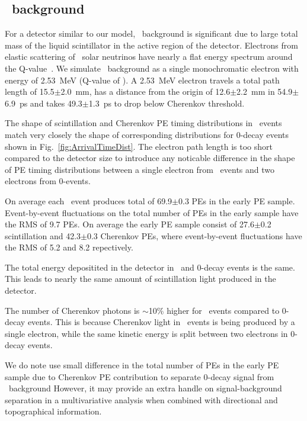 \subsection{\B~background}

For a detector similar to our model, \B~background is significant due to large total mass of the liquid scintillator in
the active region of the detector.
Electrons from elastic scattering of \B~solar neutrinos have nearly a flat energy spectrum around the 
Q-value~\cite{SNOp-B8-bkg}. We simulate \B~background as a single monochromatic electron with energy of 2.53~MeV 
(Q-value of \Te). A 2.53~MeV electron travels a total path length of 15.5$\pm$2.0~mm, has a distance from the origin of 12.6$\pm$2.2~mm in 
54.9$\pm$6.9~ps and takes 49.3$\pm$1.3~ps to drop below Cherenkov threshold.

The shape of scintillation and Cherenkov PE timing distributions in \B~events match very closely the shape of corresponding distributions
for 0\nbb-decay events shown in Fig.~\ref{fig:ArrivalTimeDist}. The electron path length is too short compared to the detector size to 
introduce any noticable difference in the shape of PE timing distributions between a single electron from \B~events and two 
electrons from 0\nbb-events.


On average each \B~event produces total of 69.9$\pm$0.3 PEs in the early PE sample.
Event-by-event fluctuations on the total number of PEs in the early sample have the RMS of 9.7 PEs.
On average the early PE sample consist of 27.6$\pm$0.2 scintillation and 42.3$\pm$0.3 Cherenkov PEs, where event-by-event fluctuations have
the RMS of 5.2 and 8.2 repectively.

The total energy depositited in the detector in \B~and 0\nbb-decay events is the same. This leads to nearly the same amount of 
scintillation light produced in the detector. 

The number of Cherenkov photons is $\sim$10\% higher for \B~events compared to 0\nbb-decay events. This is because Cherenkov 
light in \B~events is being produced by a single electron, while the same kinetic energy is split between two electrons 
in 0\nbb-decay events. 

We do note use small difference in the total number of PEs in the early PE sample due to Cherenkov PE contribution 
to separate 0\nbb-decay signal from \B~background However, it may provide an extra handle on signal-background separation in a 
multivariative analysis when combined with directional and topographical information.

